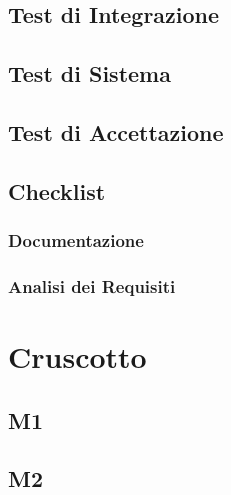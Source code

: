 \documentclass[a4paper,12pt]{article}
\begin{document}
        \subsection{Test di Integrazione}

        \subsection{Test di Sistema}

        \subsection{Test di Accettazione}
        


        \subsection{Checklist}
            \subsubsection{Documentazione}



            \subsubsection{Analisi dei Requisiti}
        


    \section{Cruscotto}
        \subsection{M1}

        \subsection{M2}
\end{document}
